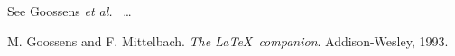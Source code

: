 \documentclass[12pt,a4paper]{article}
\begin{document}
See Goossens \emph{et
al.}~\cite{goossens93}
\ldots
\begin{thebibliography}{1}
M. Goossens and
F. Mittelbach.
\emph{The \LaTeX\
companion}.
Addison-Wesley, 1993.
\end{thebibliography}
\end{document}

